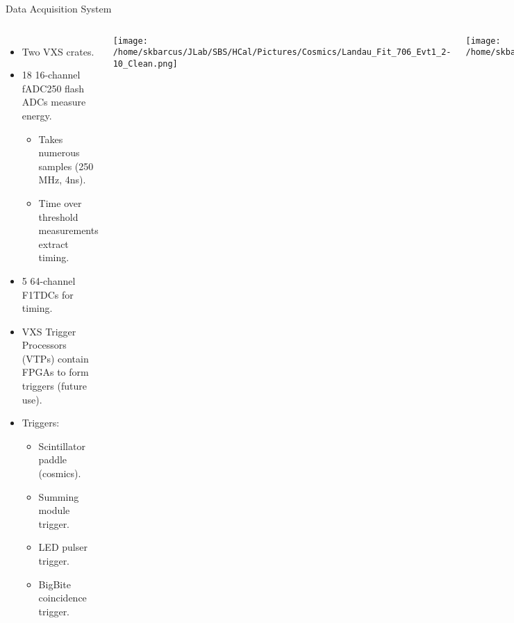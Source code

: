 \documentclass[10pt]{beamer}
\begin{document}
\begin{frame}{Data Acquisition System}

    \begin{columns}[T,onlytextwidth]
  	
  	\begin{itemize}
  		\item Two VXS crates.
  		\item {}\alert{18 16-channel fADC250 flash ADCs measure energy.}
  			\begin{itemize}
  				\item[--] Takes numerous samples (250 MHz, 4ns).
  				\item[--] Time over threshold measurements extract timing.%
  			\end{itemize}
  		\item {}\alert{5 64-channel F1TDCs for timing.}
  		\item VXS Trigger Processors (VTPs) contain FPGAs to form triggers (future use).
  		\item {}\alert{Triggers:}
  			\begin{itemize}
  				\item[--] Scintillator paddle (cosmics).
  				\item[--] Summing module trigger.
  				\item[--] LED pulser trigger.
  				\item[--] BigBite coincidence trigger.
  			\end{itemize}
  	\end{itemize}
  	
  	\vspace{-2mm}
	\centerline{\texttt{[image: /home/skbarcus/JLab/SBS/HCal/Pictures/Cosmics/Landau\_Fit\_706\_Evt1\_2-10\_Clean.png]}}
	
	\vspace{1mm}	
	
	\centerline{\texttt{[image: /home/skbarcus/JLab/SBS/HCal/Pictures/Cosmics/Cosmic\_Hit\_run820\_evt16\_Arrow.png]}}
	
	\vspace{1mm}
	
	\centerline{\texttt{[image: /home/skbarcus/Documents/JLab\_SS1/Seminar/Summing\_Module\_Triggers.png]}}

	\end{columns}

\end{frame}
\end{document}
